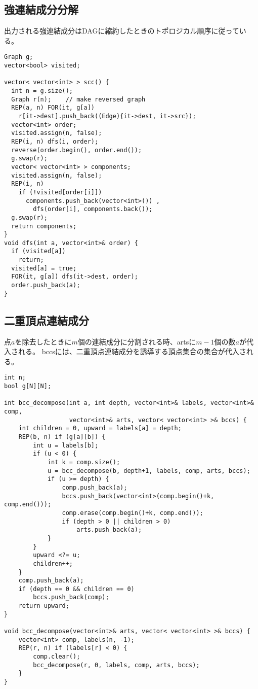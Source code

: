 \subsection{強連結成分分解}

出力される強連結成分はDAGに縮約したときのトポロジカル順序に従っている。

\begin{lstlisting}
Graph g;
vector<bool> visited;
 
vector< vector<int> > scc() {
  int n = g.size();
  Graph r(n);    // make reversed graph
  REP(a, n) FOR(it, g[a])
    r[it->dest].push_back((Edge){it->dest, it->src});
  vector<int> order;
  visited.assign(n, false);
  REP(i, n) dfs(i, order);
  reverse(order.begin(), order.end());
  g.swap(r);
  vector< vector<int> > components;
  visited.assign(n, false);
  REP(i, n)
    if (!visited[order[i]])
      components.push_back(vector<int>()) ,
        dfs(order[i], components.back());
  g.swap(r);
  return components;
}
void dfs(int a, vector<int>& order) {
  if (visited[a])
    return;
  visited[a] = true;
  FOR(it, g[a]) dfs(it->dest, order);
  order.push_back(a);
}
\end{lstlisting}



\subsection{二重頂点連結成分}

点$a$を除去したときに$m$個の連結成分に分割される時、artsに$m-1$個の数$a$が代入される。
bccsには、二重頂点連結成分を誘導する頂点集合の集合が代入される。

\begin{lstlisting}
int n;
bool g[N][N];

int bcc_decompose(int a, int depth, vector<int>& labels, vector<int>& comp,
                  vector<int>& arts, vector< vector<int> >& bccs) {
    int children = 0, upward = labels[a] = depth;
    REP(b, n) if (g[a][b]) {
        int u = labels[b];
        if (u < 0) {
            int k = comp.size();
            u = bcc_decompose(b, depth+1, labels, comp, arts, bccs);
            if (u >= depth) {
                comp.push_back(a);
                bccs.push_back(vector<int>(comp.begin()+k, comp.end()));
                comp.erase(comp.begin()+k, comp.end());
                if (depth > 0 || children > 0)
                    arts.push_back(a);
            }
        }
        upward <?= u;
        children++;
    }
    comp.push_back(a);
    if (depth == 0 && children == 0)
        bccs.push_back(comp);
    return upward;
}

void bcc_decompose(vector<int>& arts, vector< vector<int> >& bccs) {
    vector<int> comp, labels(n, -1);
    REP(r, n) if (labels[r] < 0) {
        comp.clear();
        bcc_decompose(r, 0, labels, comp, arts, bccs);
    }
}
\end{lstlisting}


